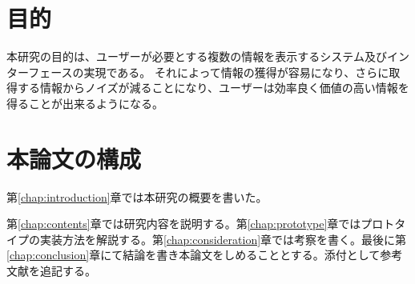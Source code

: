 \section{目的}
本研究の目的は、ユーザーが必要とする複数の情報を表示するシステム及びインターフェースの実現である。
それによって情報の獲得が容易になり、さらに取得する情報からノイズが減ることになり、ユーザーは効率良く価値の高い情報を得ることが出来るようになる。

\section{本論文の構成}
第\ref{chap:introduction}章では本研究の概要を書いた。

第\ref{chap:contents}章では研究内容を説明する。第\ref{chap:prototype}章ではプロトタイプの実装方法を解説する。第\ref{chap:consideration}章では考察を書く。最後に第\ref{chap:conclusion}章にて結論を書き本論文をしめることとする。添付として参考文献を追記する。
